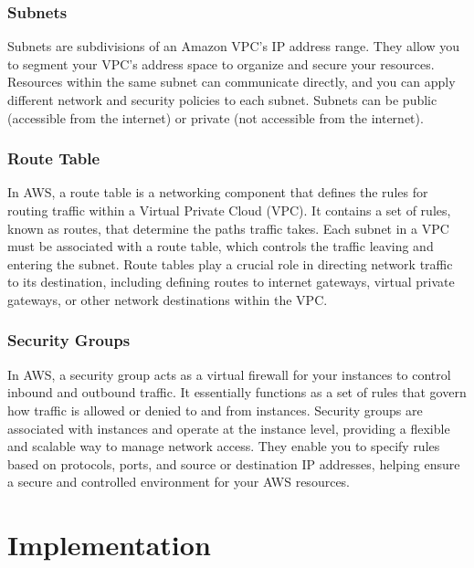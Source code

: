 \documentclass{article}
\begin{document}
\subsubsection{Subnets}
Subnets are subdivisions of an Amazon VPC's IP address range. They allow you to segment your VPC's address space to organize and secure your resources. Resources within the same subnet can communicate directly, and you can apply different network and security policies to each subnet. Subnets can be public (accessible from the internet) or private (not accessible from the internet).\par

\subsubsection{Route Table}
In AWS, a route table is a networking component that defines the rules for routing traffic within a Virtual Private Cloud (VPC). It contains a set of rules, known as routes, that determine the paths traffic takes. Each subnet in a VPC must be associated with a route table, which controls the traffic leaving and entering the subnet. Route tables play a crucial role in directing network traffic to its destination, including defining routes to internet gateways, virtual private gateways, or other network destinations within the VPC.\par
\subsubsection{Security Groups}
In AWS, a security group acts as a virtual firewall for your instances to control inbound and outbound traffic. It essentially functions as a set of rules that govern how traffic is allowed or denied to and from instances. Security groups are associated with instances and operate at the instance level, providing a flexible and scalable way to manage network access. They enable you to specify rules based on protocols, ports, and source or destination IP addresses, helping ensure a secure and controlled environment for your AWS resources.\par
\newpage

\section{Implementation}
\end{document}
